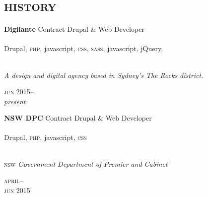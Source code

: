 
\vspace{-0.6cm}
\section*{\textsc{history}}
\vspace{-0.2cm}

\begin{minipage}[t]{0.70\textwidth}
\textbf{Digilante}\phantom{..} Contract Drupal \& Web Developer \\
\\
Drupal, \textsc{php}, javascript, \textsc{css}, \textsc{sass}, javascript, jQuery,
\\
\\
{\small
\textit{A design and digital agency based in Sydney's The Rocks district.}
\par}
\end{minipage}
\begin{minipage}[t]{0.30\textwidth}
{
\hfill \textsc{jun} 2015--\\ 
\hspace*{0pt} \hfill \textit{present}
\par
}
\end{minipage}
\vspace{0.2in}

\begin{minipage}[t]{0.70\textwidth}
\textbf{NSW DPC}\phantom{..} Contract Drupal \& Web Developer \\
\\
Drupal, \textsc{php}, javascript, \textsc{css}
\\
\\
{\small
\textsc{nsw} \textit{Government Department of Premier and Cabinet}
\par}
\end{minipage}
\begin{minipage}[t]{0.30\textwidth}
{
\hfill \textsc{april}--\\ 
\hspace*{0pt} \hfill \textsc{jun} 2015
\par
}
\end{minipage}
\vspace{0.2in}

